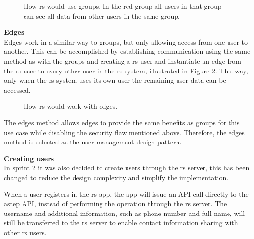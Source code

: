 \begin{figure}[h]
	\centering
	\label{fig:astepgroup}
	\caption{How \gls{rs} would use groups. In the red group all users in that group can see all data from other users in the same group.}
\end{figure}

\textbf{Edges}\\ 
Edges work in a similar way to groups, but only allowing access from one user to another.
This can be accomplished by establishing communication using the same method as with the groups and creating a \gls{rs} user and instantiate an edge from the \gls{rs} user to every other user in the \gls{rs} system, illustrated in Figure \ref{fig:astepedge}.
This way, only when the \gls{rs} system uses its own user the remaining user data can be accessed.

\begin{figure}[h]
	\centering
	\caption{How \gls{rs} would work with edges.}
	\label{fig:astepedge}
\end{figure}

The edges method allows edges to provide the same benefits as groups for this use case while disabling the security flaw mentioned above.
Therefore, the edges method is selected as the user management design pattern.

\textbf{Creating users}\\
In sprint 2 it was also decided to create users through the \gls{rs} server, this has been changed to reduce the design complexity and simplify the implementation.

When a user registers in the \gls{rs} app, the app will issue an API call directly to the \gls{astep} API, instead of performing the operation through the \gls{rs} server. 
The username and additional information, such as phone number and full name, will still be transferred to the \gls{rs} server to enable contact information sharing with other \gls{rs} users.